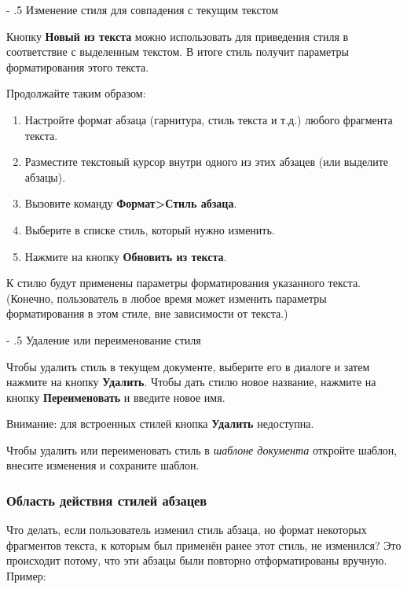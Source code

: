 ﻿\documentclass[a4paper,10pt]{article}
\makeatletter
\renewcommand\paragraph{%
   \@startsection{paragraph}{4}{0mm}%
      {-\baselineskip}%
      {.5\baselineskip}%
      {\normalfont\normalsize\bfseries}}
\makeatother
\begin{document}
\paragraph{Изменение стиля для совпадения с текущим текстом}

Кнопку \textbf{Новый из текста} можно использовать для приведения стиля в соответствие с выделенным текстом. В итоге стиль получит параметры форматирования этого текста.

Продолжайте таким образом:
\begin{enumerate}
 \item Настройте формат абзаца (гарнитура, стиль текста и т.д.) любого фрагмента текста.
 \item Разместите текстовый курсор внутри одного из этих абзацев (или выделите абзацы).
 \item Вызовите команду \textbf{Формат>Стиль абзаца}.
 \item Выберите в списке стиль, который нужно изменить.
 \item Нажмите на кнопку \textbf{Обновить из текста}.
\end{enumerate}

К стилю будут применены параметры форматирования указанного текста. (Конечно, пользователь в любое время может изменить параметры форматирования в этом стиле, вне зависимости от текста.)

\paragraph{Удаление или переименование стиля}

Чтобы удалить стиль в текущем документе, выберите его в диалоге и затем нажмите на кнопку \textbf{Удалить}. Чтобы дать стилю новое название, нажмите на кнопку \textbf{Переименовать} и введите новое имя.

Внимание: для встроенных стилей кнопка \textbf{Удалить} недоступна.

Чтобы удалить или переименовать стиль в \textit{шаблоне документа} откройте шаблон, внесите изменения и сохраните шаблон.

\subsubsection{Область действия стилей абзацев}
Что делать, если пользователь изменил стиль абзаца, но формат некоторых фрагментов текста, к которым был применён ранее этот стиль, не изменился? Это происходит потому, что эти абзацы были повторно отформатированы вручную. Пример:
\end{document}
